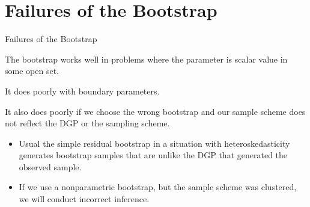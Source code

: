 \documentclass[aspectratio=169, handout]{beamer}
\begin{document}
\section{Failures of the Bootstrap}


{\footnotesize
\begin{frame}{Failures of the Bootstrap}

The bootstrap works well in problems where the parameter is scalar value
in some open set.

It does poorly with boundary parameters.

It also does poorly if we choose the wrong bootstrap and our sample
scheme does not reflect the DGP or the sampling scheme.
\begin{itemize}
  \item Usual the simple residual bootstrap in a situation with
    heteroskedasticity generates bootstrap samples that are unlike the
    DGP that generated the observed sample.
  \item If we use a nonparametric bootstrap, but the sample scheme was
    clustered, we will conduct incorrect inference.
\end{itemize}
\end{frame}
}
\end{document}

